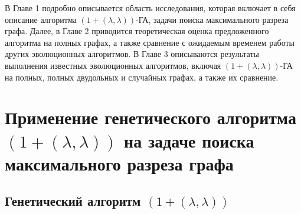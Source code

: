 \documentclass[times]{itmo-student-thesis}
\newcommand{\alglambda}{${(1 + (\lambda , \lambda))}$\xspace}
\newcommand{\alglambdaf}{${(1 + (\lambda , \lambda))}$-ГА\xspace}
\begin{document}

\tableofcontents

\startprefacepage
В Главе 1 подробно описывается область исследования, которая включает в себя описание алгоритма \alglambdaf, задачи поиска максимального разреза графа.
Далее, в Главе 2 приводится теоретическая оценка предложенного алгоритма на полных графах, а также сравнение с ожидаемым временем работы других эволюционных алгоритмов.
В Главе 3 описываются результаты выполнения известных эволюционных алгоритмов, включая \alglambdaf на полных, полных двудольных и случайных графах, а также их сравнение.

\chapter{Применение генетического алгоритма \alglambda на задаче поиска максимального разреза графа}

\startrelatedwork

\finishrelatedwork

\section{Генетический алгоритм \alglambda}
\end{document}

